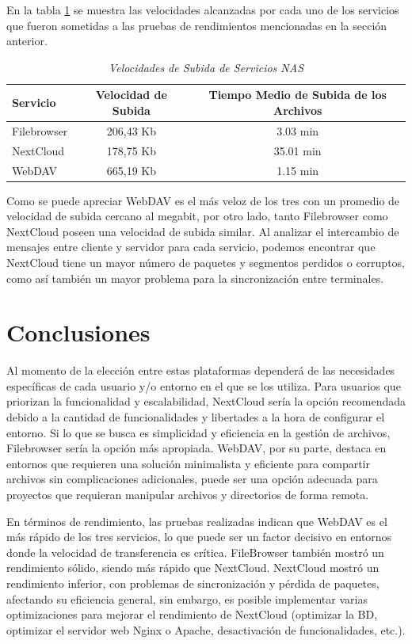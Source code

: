 \documentclass[a4paper,10pt]{article}
\begin{document}
	En la tabla \ref{tabla:velocidades_subida} se muestra las velocidades alcanzadas por cada uno de los servicios que fueron sometidas a las pruebas de rendimientos mencionadas en la sección anterior.

	\begin{table}[H]
		\centering
		\caption{\textit{Velocidades de Subida de Servicios NAS}}
		\label{tabla:velocidades_subida}
		\small %
		\begin{tabular}{lcc}
			\toprule
			\textbf{Servicio} & \textbf{Velocidad de Subida} & \textbf{Tiempo Medio de Subida de los Archivos} \\
			\midrule
			Filebrowser & 206,43 Kb & 3.03 min \\
			NextCloud & 178,75 Kb & 35.01 min \\
			WebDAV & 665,19 Kb & 1.15 min \\
			\bottomrule
		\end{tabular}
	\end{table}

	Como se puede apreciar WebDAV es el más veloz de los tres con un promedio de velocidad de subida cercano al megabit, por otro lado, tanto Filebrowser como NextCloud poseen una velocidad de subida similar. Al analizar el intercambio de mensajes entre cliente y servidor para cada servicio, podemos encontrar que NextCloud tiene un mayor número de paquetes y segmentos perdidos o corruptos, como así también un mayor problema para la sincronización entre terminales.
	
	\section{Conclusiones}
	Al momento de la elección entre estas plataformas dependerá de las necesidades específicas de cada usuario y/o entorno en el que se los utiliza. Para usuarios que priorizan la funcionalidad y escalabilidad, NextCloud sería la opción recomendada debido a la cantidad de funcionalidades y libertades a la hora de configurar el entorno. Si lo que se busca es simplicidad y eficiencia en la gestión de archivos, Filebrowser sería la opción más apropiada. WebDAV, por su parte, destaca en entornos que requieren una solución minimalista y eficiente para compartir archivos sin complicaciones adicionales, puede ser una opción adecuada para proyectos que requieran manipular archivos y directorios de forma remota.
	
	En términos de rendimiento, las pruebas realizadas indican que WebDAV es el más rápido de los tres servicios, lo que puede ser un factor decisivo en entornos donde la velocidad de transferencia es crítica. FileBrowser también mostró un rendimiento sólido, siendo más rápido que NextCloud. NextCloud mostró un rendimiento inferior, con problemas de sincronización y pérdida de paquetes, afectando su eficiencia general, sin embargo, es posible implementar varias optimizaciones para mejorar el rendimiento de NextCloud (optimizar la BD, optimizar el servidor web Nginx o Apache, desactivación de funcionalidades, etc.).
	
\end{document}
